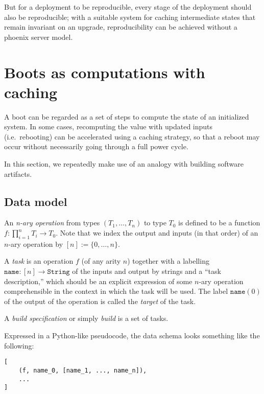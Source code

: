   But for a deployment to be reproducible, every stage of the deployment should also be reproducible; with a suitable system for caching intermediate states that remain invariant on an upgrade, reproducibility can be achieved without a phoenix server model.


\section{Boots as computations with caching} \label{build}

A boot can be regarded as a set of steps to compute the state of an initialized system. 
%
In some cases, recomputing the value with updated inputs (i.e.~rebooting) can be accelerated using a caching strategy, so that a reboot may occur without necessarily going through a full power cycle.

In this section, we repeatedly make use of an analogy with building software artifacts.

\subsection{Data model}

\begin{definition}
  
  An \emph{n-ary operation} from types \((T_1,\ldots,T_n)\) to type \(T_0\) is defined to be a function \(f:\prod_{i=1}^n T_i \rightarrow T_0\). 
  Note that we index the output and inputs (in that order) of an \(n\)-ary operation by \([n]:=\{0,\ldots,n\}\).

  A \emph{task} is an operation \(f\) (of any arity \(n\)) together with a labelling \(\mathtt{name}:[n]\rightarrow \mathtt{String}\) of the inputs and output by strings and a ``task description,'' which should be an explicit expression of some $n$-ary operation comprehensible in the context in which the task will be used.
  The label \(\mathtt{name}(0)\) of the output of the operation is called the \emph{target} of the task.

  A \emph{build specification} or simply \emph{build} is a set of tasks.

\end{definition}

Expressed in a Python-like pseudocode, the data schema looks something like the following:

\begin{lstlisting}
[
    (f, name_0, [name_1, ..., name_n]),
    ...
]
\end{lstlisting}

